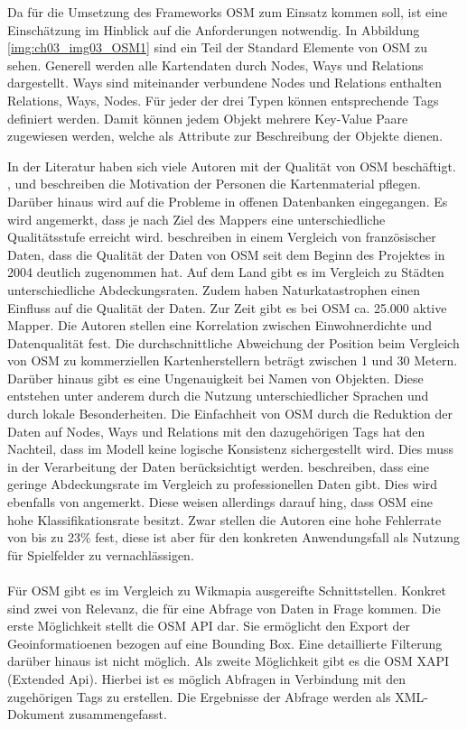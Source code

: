 Da für die Umsetzung des Frameworks OSM zum Einsatz kommen soll, ist eine Einschätzung im Hinblick auf die Anforderungen notwendig.
In Abbildung \ref{img:ch03_img03_OSM1} sind ein Teil der Standard Elemente von OSM zu sehen.
Generell werden alle Kartendaten durch Nodes, Ways und Relations dargestellt. Ways sind miteinander verbundene Nodes und Relations enthalten Relations, Ways, Nodes.
Für jeder der drei Typen können entsprechende Tags definiert werden. Damit können jedem Objekt mehrere Key-Value Paare zugewiesen werden, welche als Attribute zur Beschreibung der Objekte dienen.

In der Literatur haben sich viele Autoren mit der Qualität von OSM beschäftigt.
\textcite{Haklay.2010}, \textcite{Flanagin.2008} und \textcite{Goodchild.2007} beschreiben die Motivation der Personen die Kartenmaterial pflegen. Darüber hinaus wird auf die Probleme in offenen Datenbanken eingegangen. Es wird angemerkt, dass je nach Ziel des Mappers eine unterschiedliche Qualitätsstufe erreicht wird.
\textcite{Girres.2010} beschreiben in einem Vergleich von französischer Daten, dass die Qualität der Daten von OSM seit dem Beginn des Projektes in 2004 deutlich zugenommen hat. Auf dem Land gibt es im Vergleich zu Städten unterschiedliche Abdeckungsraten. Zudem haben Naturkatastrophen einen Einfluss auf die Qualität der Daten.\cite{Zook.2010}
Zur Zeit gibt es bei OSM ca. 25.000 aktive Mapper.\cite{OSM.2013} Die Autoren stellen eine Korrelation zwischen Einwohnerdichte und Datenqualität fest.
Die durchschnittliche Abweichung der Position beim Vergleich von OSM zu kommerziellen Kartenherstellern beträgt zwischen 1 und 30 Metern.
Darüber hinaus gibt es eine Ungenauigkeit bei Namen von Objekten. Diese entstehen unter anderem durch die Nutzung unterschiedlicher Sprachen und durch lokale Besonderheiten.
Die Einfachheit von OSM durch die Reduktion der Daten auf Nodes, Ways und Relations mit den dazugehörigen Tags hat den Nachteil, dass im Modell keine logische Konsistenz sichergestellt wird. Dies muss in der Verarbeitung der Daten berücksichtigt werden.
\textcite{Hecht.2013} beschreiben, dass eine geringe Abdeckungsrate im Vergleich zu professionellen Daten gibt. Dies wird ebenfalls von \textcite{Pfoser.2013} angemerkt. Diese weisen allerdings darauf hing, dass OSM eine hohe Klassifikationsrate besitzt. Zwar stellen die Autoren eine hohe Fehlerrate von bis zu 23\% fest, diese ist aber für den konkreten Anwendungsfall als Nutzung für Spielfelder  zu vernachlässigen.
\\\\
Für OSM gibt es im Vergleich zu Wikmapia ausgereifte Schnittstellen. Konkret sind zwei von Relevanz, die für eine Abfrage von Daten in Frage kommen.
Die erste Möglichkeit stellt die OSM API dar. Sie ermöglicht den Export der Geoinformatioenen bezogen auf eine Bounding Box. Eine detaillierte Filterung darüber hinaus ist nicht möglich.
Als zweite Möglichkeit gibt es die OSM XAPI (Extended Api). Hierbei ist es möglich Abfragen in Verbindung mit den zugehörigen Tags zu erstellen.\cite{Meyer.2013} Die Ergebnisse der Abfrage werden als XML-Dokument zusammengefasst.

